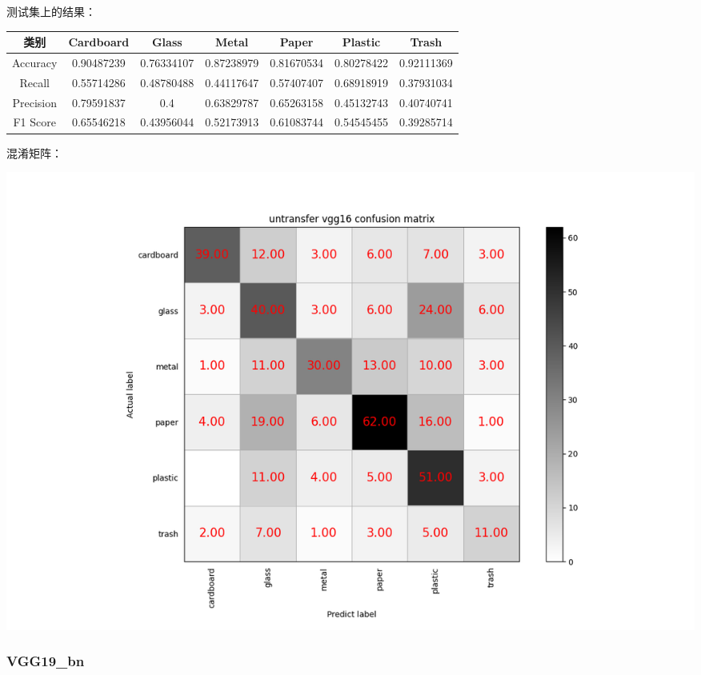 \documentclass[UTF8]{ctexart}
\begin{document}
测试集上的结果：

\begin{tabular}{|c|c|c|c|c|c|c|}
\hline 
类别 & Cardboard & Glass & Metal & Paper & Plastic & Trash \\ 
\hline 
Accuracy &0.90487239 &0.76334107& 0.87238979& 0.81670534 &0.80278422& 0.92111369\\
 \hline 
Recall &0.55714286 &0.48780488& 0.44117647 &0.57407407& 0.68918919 &0.37931034\\ 
\hline 
Precision &0.79591837& 0.4       & 0.63829787& 0.65263158& 0.45132743 &0.40740741 \\ 
\hline 
F1 Score &0.65546218& 0.43956044 &0.52173913& 0.61083744& 0.54545455& 0.39285714 \\ 
\hline 
\end{tabular}

混淆矩阵：

\includegraphics[scale=0.5]{cm/unvgg16.png} 
\subsubsection{VGG19\_bn}
\end{document}
